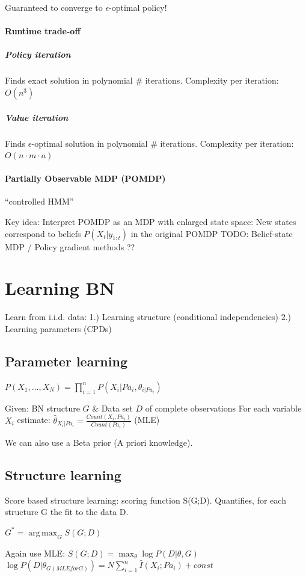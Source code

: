 \documentclass[a4paper, 11pt]{scrartcl}
\DeclareMathOperator*{\argmax}{arg\,max}
\begin{document}
\begin{multicols*}{3}
Guaranteed to converge to $\epsilon$-optimal policy!

\paragraph{Runtime trade-off}
\subparagraph{Policy iteration}
Finds exact solution in polynomial \# iterations. Complexity per iteration: $O(n^3)$
\subparagraph{Value iteration}
Finds $\epsilon$-optimal solution in polynomial \# iterations. Complexity per iteration: $O(n\cdot m \cdot a)$

\paragraph{Partially Observable MDP (POMDP)} ``controlled HMM''

Key idea: Interpret POMDP as an MDP with enlarged state space: New states correspond to beliefs $P(X_t | y_{1:t})$ in the original POMDP
TODO: Belief-state MDP / Policy gradient methods ??

\section{Learning BN}
Learn from i.i.d. data: 1.) Learning structure (conditional independencies) 2.) Learning parameters (CPDs)

\subsection{Parameter learning} 

$P(X_1, ..., X_N) = \prod_{i=1}^{n} P(X_i | Pa_i, {\theta}_{i | Pa_i})$

Given:  BN structure $G$ \& Data set $D$ of complete observations
For each variable $X_i$ estimate: $\hat{\theta}_{X_i | Pa_i} = \frac{Count(X_i , Pa_i)}{Count(Pa_i)}$ (MLE)

We can also use a Beta prior (A priori knowledge).

\subsection{Structure learning}

Score based structure learning: scoring function S(G;D). Quantifies, for each structure G the fit to the data D. 

$G^* = \argmax_G S(G;D)$

Again use MLE: $S(G;D) = \max_\theta \log P(D | \theta, G)$
$\log P(D | \theta_{G (MLE for G)}) = N \sum_{i=1}^{n} \hat{I}(X_i ; Pa_i) + const$


\end{multicols*}
\end{document}
